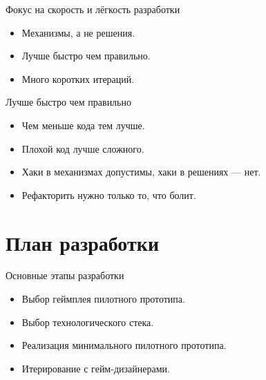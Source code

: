 \documentclass[aspectratio=169,handout,bigger]{beamer}
\begin{document}

\begin{frame}{Фокус на скорость и лёгкость разработки}
  \begin{itemize}
    \item Механизмы, а не решения.
    \item Лучше быстро чем правильно.
    \item Много коротких итераций.
  \end{itemize}
\end{frame}


\begin{frame}{Лучше быстро чем правильно}
  \begin{itemize}
    \item Чем меньше кода тем лучше.
    \item Плохой код лучше сложного.
    \item Хаки в механизмах допустимы, хаки в решениях --- нет.
    \item Рефакторить нужно только то, что болит.
  \end{itemize}
\end{frame}


\section{План разработки}


\begin{frame}{Основные этапы разработки}
  \begin{itemize}
    \item Выбор геймплея пилотного прототипа.
    \item Выбор технологического стека.
    \item Реализация минимального пилотного прототипа.
    \item Итерирование с гейм-дизайнерами.
  \end{itemize}
\end{frame}

\end{document}
